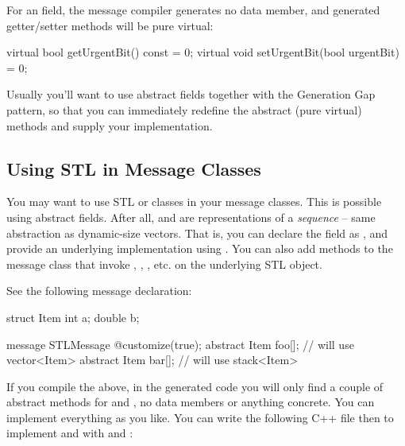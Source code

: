 For an  field, the message compiler generates
no data member, and generated getter/setter methods will be pure
virtual:

\begin{cpp}
virtual bool getUrgentBit() const = 0;
virtual void setUrgentBit(bool urgentBit) = 0;
\end{cpp}


Usually you'll want to use abstract fields together with
the Generation Gap pattern, so that you can immediately
redefine the abstract (pure virtual) methods and
supply your implementation.



\subsection{Using STL in Message Classes}




You may want to use STL  or  classes in your message classes.
This is possible using abstract fields. After all,  and 
are representations of a \textit{sequence} -- same abstraction as dynamic-size vectors.
That is, you can declare the field as , and provide
an underlying implementation using . You can also add methods
to the message class that invoke , , , etc.
on the underlying STL object.

See the following message declaration:

\begin{msg}
struct Item
{
    int a;
    double b;
}

message STLMessage
{
   @customize(true);
   abstract Item foo[]; // will use vector<Item>
   abstract Item bar[]; // will use stack<Item>
}
\end{msg}

If you compile the above, in the generated code you will only find a couple of
abstract methods for  and , no data members or anything concrete.
You can implement everything as you like. You can write the following C++ file
then to implement  and  with  and :

